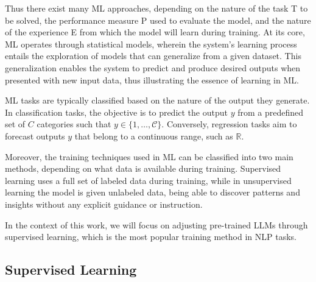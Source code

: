 \documentclass[11pt,english,listoffigures,listoftables]{tfgetsinf}
\begin{document}

Thus there exist many ML approaches, depending on the nature of the task T to be solved, the performance measure P used to evaluate the model, and the nature of the experience E from which the model will learn during training. At its core, ML operates through statistical models, wherein the system's learning process entails the exploration of models that can generalize from a given dataset. This generalization enables the system to predict and produce desired outputs when presented with new input data, thus illustrating the essence of learning in ML.

ML tasks are typically classified based on the nature of the output they generate. In classification tasks, the objective is to predict the output \( y \) from a predefined set of \( C \) categories such that $y \in \{1, \ldots, \mathcal{C}\}$. Conversely, regression tasks aim to forecast outputs \( y \) that belong to a continuous range, such as $\mathbb{R}$.

Moreover, the training techniques used in ML can be classified into two main methods, depending on what data is available during training. Supervised learning uses a full set of labeled data during training, while in unsupervised learning the model is given unlabeled data, being able to discover patterns and insights without any explicit guidance or instruction.

In the context of this work, we will focus on adjusting pre-trained LLMs through supervised learning, which is the most popular training method in NLP tasks.

\subsection{Supervised Learning}
\end{document}
